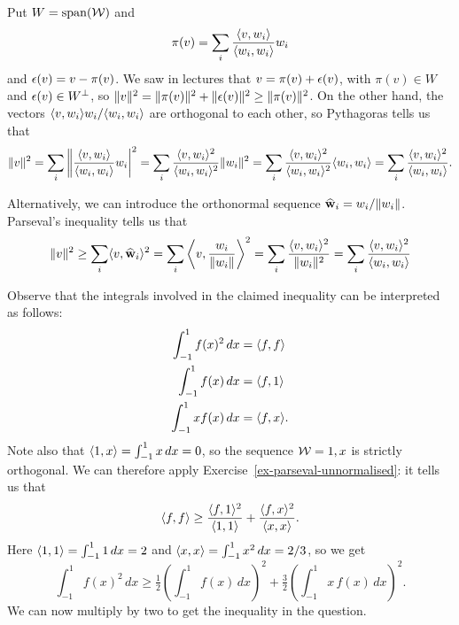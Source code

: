  Put $W=\operatorname{span}({\mathcal{W}})$ and
 \[ \pi(v) = \sum_i \frac{\langle v,w_i\rangle}{\langle w_i,w_i\rangle} w_i \]
 and $\epsilon(v)=v-\pi(v)$.  We saw in lectures that $v=\pi(v)+\epsilon(v)$,
 with $\pi(v)\in W$ and $\epsilon(v)\in W^\perp$, so
 $\|v\|^2=\|\pi(v)\|^2+\|\epsilon(v)\|^2\geq\|\pi(v)\|^2$.  On the other
 hand, the vectors $\langle v,w_i\rangle w_i/\langle w_i,w_i\rangle$ are orthogonal to each
 other, so Pythagoras tells us that
 \[ \|v\|^2 =
     \sum_i \left\| \frac{\langle v,w_i\rangle}{\langle w_i,w_i\rangle} w_i\right|^2 =
     \sum_i \frac{\langle v,w_i\rangle^2}{\langle w_i,w_i\rangle^2} \|w_i\|^2 =
     \sum_i \frac{\langle v,w_i\rangle^2}{\langle w_i,w_i\rangle^2} \langle w_i,w_i\rangle =
     \sum_i \frac{\langle v,w_i\rangle^2}{\langle w_i,w_i\rangle}.
 \]

 Alternatively, we can introduce the orthonormal sequence
 $\widehat{\mathbf{w}}_i=w_i/\|w_i\|$.  Parseval's inequality tells us that
 \[ \|v\|^2 \geq \sum_i \langle v,\widehat{\mathbf{w}}_i\rangle^2
     = \sum_i \left\langle v,\frac{w_i}{\|w_i\|}\right\rangle^2
     = \sum_i \frac{\langle v,w_i\rangle^2}{\|w_i\|^2}
     = \sum_i \frac{\langle v,w_i\rangle^2}{\langle w_i,w_i\rangle}
 \]
\EndDeferredSolution

 Observe that the integrals involved in the claimed inequality can be
 interpreted as follows:
 \begin{align*}
  \int_{-1}^1 f(x)^2\,dx &= \langle f,f\rangle \\
  \int_{-1}^1 f(x)\,dx   &= \langle f,1\rangle \\
  \int_{-1}^1 x f(x)\,dx &= \langle f,x\rangle.
 \end{align*}
 Note also that $\langle 1,x\rangle=\int_{-1}^1x\,dx=0$, so the sequence
 ${\mathcal{W}}=1,x$ is strictly orthogonal.  We can therefore apply
 Exercise~\ref{ex-parseval-unnormalised}: it tells us that
 \[ \langle f,f\rangle \geq \frac{\langle f,1\rangle^2}{\langle 1,1\rangle} +
                  \frac{\langle f,x\rangle^2}{\langle x,x\rangle}.
 \]
 Here $\langle 1,1\rangle=\int_{-1}^1 1\,dx=2$ and
 $\langle x,x\rangle=\int_{-1}^1x^2\,dx=2/3$, so we get
 \[ \int_{-1}^1 f(x)^2\, dx
     \geq \tfrac{1}{2} \left(\int_{-1}^1 f(x)\,dx\right)^2 +
          \tfrac{3}{2} \left(\int_{-1}^1 x\,f(x)\,dx\right)^2.
 \]
 We can now multiply by two to get the inequality in the question.
\EndDeferredSolution

